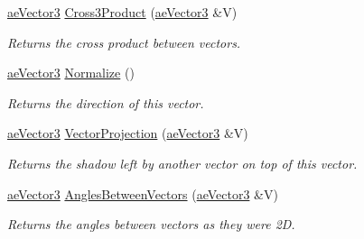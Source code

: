 \begin{DoxyCompactItemize}
\hyperlink{structae_core_1_1ae_vector3}{ae\+Vector3} \hyperlink{structae_core_1_1ae_vector3_a814add51f20a124cf4fc68b2f8b3f390}{Cross3\+Product} (\hyperlink{structae_core_1_1ae_vector3}{ae\+Vector3} \&V)
\begin{DoxyCompactList}\small\item\em Returns the cross product between vectors. \end{DoxyCompactList}\item 
\hyperlink{structae_core_1_1ae_vector3}{ae\+Vector3} \hyperlink{structae_core_1_1ae_vector3_a667ef4dede390119508dc9419c36b9a4}{Normalize} ()
\begin{DoxyCompactList}\small\item\em Returns the direction of this vector. \end{DoxyCompactList}\item 
\hyperlink{structae_core_1_1ae_vector3}{ae\+Vector3} \hyperlink{structae_core_1_1ae_vector3_aed53d5d422de288adaf11003ddbc27fe}{Vector\+Projection} (\hyperlink{structae_core_1_1ae_vector3}{ae\+Vector3} \&V)
\begin{DoxyCompactList}\small\item\em Returns the shadow left by another vector on top of this vector. \end{DoxyCompactList}\item 
\hyperlink{structae_core_1_1ae_vector3}{ae\+Vector3} \hyperlink{structae_core_1_1ae_vector3_a5b3fa647aea5a516abe7cfea8353621f}{Angles\+Between\+Vectors} (\hyperlink{structae_core_1_1ae_vector3}{ae\+Vector3} \&V)
\begin{DoxyCompactList}\small\item\em Returns the angles between vectors as they were 2D. \end{DoxyCompactList}\end{DoxyCompactItemize}
